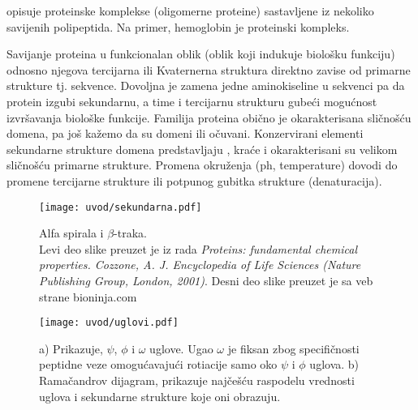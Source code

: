  opisuje proteinske komplekse (oligomerne proteine) sastavljene
iz nekoliko savijenih polipeptida. Na primer, hemoglobin je proteinski kompleks.

Savijanje proteina u funkcionalan oblik (oblik koji indukuje biološku funkciju)
odnosno njegova tercijarna ili Kvaternerna struktura direktno zavise od
primarne strukture tj. sekvence. Dovoljna je zamena jedne aminokiseline u sekvenci
pa da protein izgubi sekundarnu, a time i tercijarnu strukturu gubeći mogućnost
izvršavanja biološke funkcije. Familija proteina obično je okarakterisana
sličnošću domena, pa još kažemo da su domeni  ili očuvani.
Konzervirani elementi sekundarne strukture domena predstavljaju
, kraće  i okarakterisani su velikom
sličnošću primarne strukture. Promena okruženja (ph, temperature) dovodi do promene
tercijarne strukture ili potpunog gubitka strukture (denaturacija).

\begin{figure}[th]
\centering
\hspace*{-2.0cm} 
\texttt{[image: uvod/sekundarna.pdf]}
\caption {
  Alfa spirala i $\beta$-traka.\\ \footnotesize Levi deo slike preuzet je iz rada
  \textit{Proteins: fundamental chemical properties. Cozzone, A. J.
  Encyclopedia of Life Sciences (Nature Publishing Group, London, 2001)}.
  Desni deo slike preuzet je sa veb strane bioninja.com
}
\label{fig:sekundarna}
\end{figure}

\begin{figure}[th]
\centering
\texttt{[image: uvod/uglovi.pdf]}
\caption {
  \footnotesize
  a) Prikazuje, $\psi$, $\phi$ i $\omega$ uglove. Ugao $\omega$ je fiksan
  zbog specifičnosti peptidne veze omogućavajući rotiacije samo oko
  $\psi$ i $\phi$ uglova.
  b) Ramačandrov dijagram, prikazuje najčešću raspodelu vrednosti uglova
  i sekundarne strukture koje oni obrazuju.
}
\label{fig:uglovi}
\end{figure}



